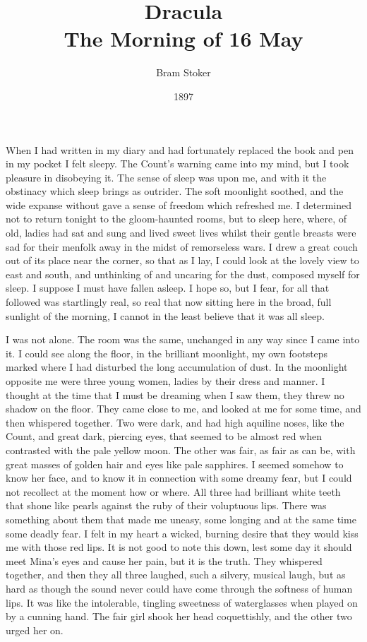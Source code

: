 \documentclass[10pt,a4paper]{article}
\begin{document}
\title{Dracula\\\normalsize\plantin The Morning of 16 May}
\date{1897}
\author{Bram Stoker}
\maketitle
    
\thispagestyle{plain}
\setcounter{page}{1}
\linenumbers
When I had written in my diary and had fortunately replaced the book and pen in my pocket I felt sleepy. The Count's warning came into my mind, but I took pleasure in disobeying it. The sense of sleep was upon me, and with it the obstinacy which sleep brings as outrider. The soft moonlight soothed, and the wide expanse without gave a sense of freedom which refreshed me. I determined not to return tonight to the gloom-haunted rooms, but to sleep here, where, of old, ladies had sat and sung and lived sweet lives whilst their gentle breasts were sad for their menfolk away in the midst of remorseless wars. I drew a great couch out of its place near the corner, so that as I lay, I could look at the lovely view to east and south, and unthinking of and uncaring for the dust, composed myself for sleep. I suppose I must have fallen asleep. I hope so, but I fear, for all that followed was startlingly real, so real that now sitting here in the broad, full sunlight of the morning, I cannot in the least believe that it was all sleep.

I was not alone. The room was the same, unchanged in any way since I came into it. I could see along the floor, in the brilliant moonlight, my own footsteps marked where I had disturbed the long accumulation of dust. In the moonlight opposite me were three young women, ladies by their dress and manner. I thought at the time that I must be dreaming when I saw them, they threw no shadow on the floor. They came close to me, and looked at me for some time, and then whispered together. Two were dark, and had high aquiline noses, like the Count, and great dark, piercing eyes, that seemed to be almost red when contrasted with the pale yellow moon. The other was fair, as fair as can be, with great masses of golden hair and eyes like pale sapphires. I seemed somehow to know her face, and to know it in connection with some dreamy fear, but I could not recollect at the moment how or where. All three had brilliant white teeth that shone like pearls against the ruby of their voluptuous lips. There was something about them that made me uneasy, some longing and at the same time some deadly fear. I felt in my heart a wicked, burning desire that they would kiss me with those red lips. It is not good to note this down, lest some day it should meet Mina's eyes and cause her pain, but it is the truth. They whispered together, and then they all three laughed, such a silvery, musical laugh, but as hard as though the sound never could have come through the softness of human lips. It was like the intolerable, tingling sweetness of waterglasses when played on by a cunning hand. The fair girl shook her head coquettishly, and the other two urged her on.
\end{document}
